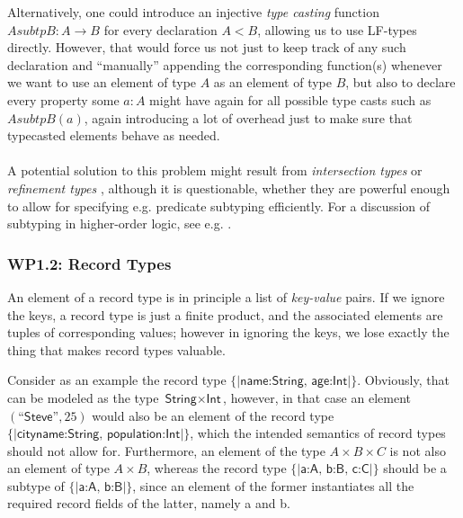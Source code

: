 Alternatively, one could introduce an injective \emph{type casting} function $AsubtpB:A\to B$ for every declaration $A<B$, allowing us to use LF-types directly. However, that would force us not just to keep track of any such declaration and ``manually'' appending the corresponding function(s) whenever we want to use an element of type $A$ as an element of type $B$, but also to declare every property some $a:A$ might have again for all possible type casts such as $AsubtpB(a)$, again introducing a lot of overhead just to make sure that typecasted elements behave as needed. 

\paragraph{} A potential solution to this problem might result from \emph{intersection types}\cite{Pfenning92} or \emph{refinement types} \cite{Pfenning93}, although it is questionable, whether they are powerful enough to allow for specifying e.g. predicate subtyping efficiently. For a discussion of subtyping in higher-order logic, see e.g. \cite{Kohlhase:amosho94}.

\subsubsection{\textbf{WP1.2}:  Record Types}
An element of a record type is in principle a list of \emph{key-value} pairs. If we ignore the keys, a record type is just a finite product, and the associated elements are tuples of corresponding values; however in ignoring the keys, we lose exactly the thing that makes record types valuable.

Consider as an example the record type $\{|\textsf{name:String, age:Int}|\}$. Obviously, that can be modeled as the type $\textsf{String}\times\textsf{Int}$, however, in that case an element $(\textsf{``Steve''},25)$ would also be an element of the record type $\{|\textsf{cityname:String, population:Int}|\}$, which the intended semantics of record types should not allow for. Furthermore, an element of the type $A\times B\times C$ is not also an element of type $A\times B$, whereas the record type $\{|\textsf{a:A, b:B, c:C} |\}$ should be a subtype of 
$\{|\textsf{a:A, b:B} |\}$, since an element of the former instantiates all the required record fields of the latter, namely \textsf{a} and \textsf{b}.

